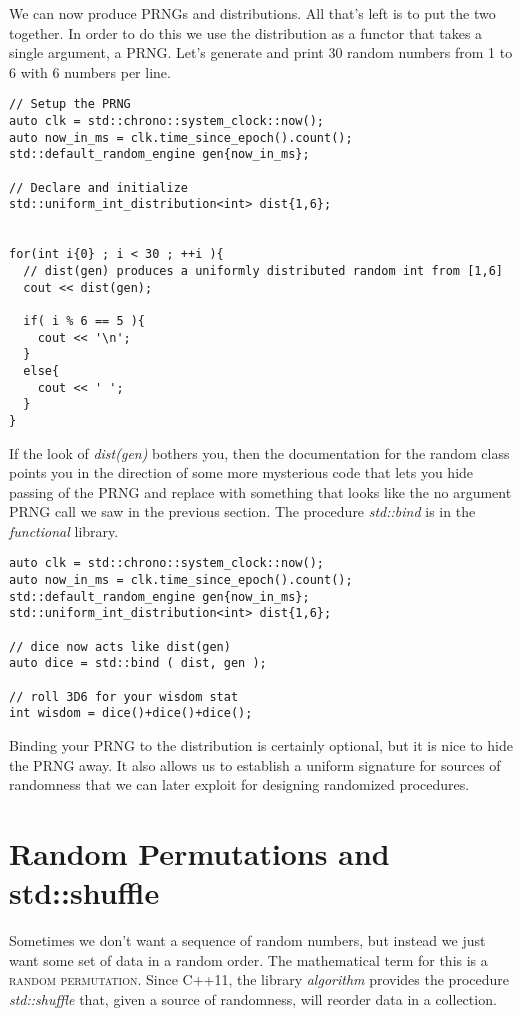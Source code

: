 \documentclass[]{tufte-handout}
\begin{document}
We can now produce PRNGs and distributions. All that's left is to put the two together. In order to do this we use the distribution as a functor that takes a single argument, a PRNG.  Let's generate and print 30 random numbers from 1 to 6 with 6 numbers per line.
\begin{verbatim}
// Setup the PRNG
auto clk = std::chrono::system_clock::now();
auto now_in_ms = clk.time_since_epoch().count();
std::default_random_engine gen{now_in_ms};

// Declare and initialize
std::uniform_int_distribution<int> dist{1,6};


for(int i{0} ; i < 30 ; ++i ){
  // dist(gen) produces a uniformly distributed random int from [1,6]
  cout << dist(gen);

  if( i % 6 == 5 ){
    cout << '\n';
  }
  else{
    cout << ' ';
  }
}
\end{verbatim}

If the look of \textit{dist(gen)} bothers you, then the documentation for the random class points you in the direction of some more mysterious code that lets you hide passing of the PRNG and replace  with something that looks like the no argument PRNG call we saw in the previous section.  The procedure \textit{std::bind} is in the \textit{functional} library.
\begin{verbatim}
auto clk = std::chrono::system_clock::now();
auto now_in_ms = clk.time_since_epoch().count();
std::default_random_engine gen{now_in_ms};
std::uniform_int_distribution<int> dist{1,6};

// dice now acts like dist(gen)
auto dice = std::bind ( dist, gen );

// roll 3D6 for your wisdom stat
int wisdom = dice()+dice()+dice();
\end{verbatim}
Binding your PRNG to the distribution is certainly optional, but it is nice to hide the PRNG away. It also allows us to establish a uniform signature for sources of randomness that we can later exploit for designing randomized procedures.

\section{Random Permutations and std::shuffle}

Sometimes we don't want a sequence of random numbers, but instead we just want some set of data in a random order. The mathematical term for this is a \textsc{random permutation}. Since C++11, the library \textit{algorithm} provides the procedure \textit{std::shuffle} that, given a source of randomness, will reorder data in a collection.
\end{document}
